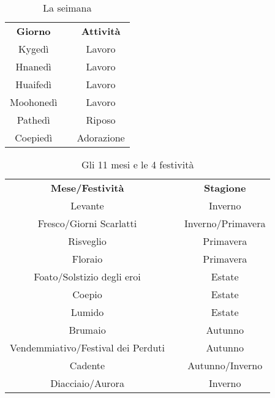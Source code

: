 \documentclass[a4paper]{report}
\begin{document}
	\vspace{1cm}
	\begin{table}[h]
		\centering
		\begin{tabular}{||ccc||}
			\bf Giorno & & \bf Attività\\
			Kygedì & & Lavoro\\
			Hnanedì & & Lavoro\\
			Huaifedì & & Lavoro\\
			Moohonedì & & Lavoro\\
			Pathedì & & Riposo\\
			Coepiedì & & Adorazione\\
		\end{tabular}
		\caption{La seimana}
	\end{table}
\vspace{1cm}
	\begin{table}[h]
		\centering
		\begin{tabular}{||ccc||}
			\bf Mese/Festività  & & \bf Stagione \\
			Levante & & Inverno\\
			Fresco/Giorni Scarlatti & & Inverno/Primavera\\
			Risveglio & & Primavera\\
			Floraio & & Primavera\\
			Foato/Solstizio degli eroi & & Estate\\
			Coepio & & Estate\\
			Lumido & & Estate\\
			Brumaio & & Autunno\\
			Vendemmiativo/Festival dei Perduti & & Autunno\\
			Cadente & & Autunno/Inverno\\ 
			Diacciaio/Aurora & & Inverno\\
		\end{tabular}
		\caption{Gli 11 mesi e le 4 festività}
	\end{table}
	\newpage
\end{document}
